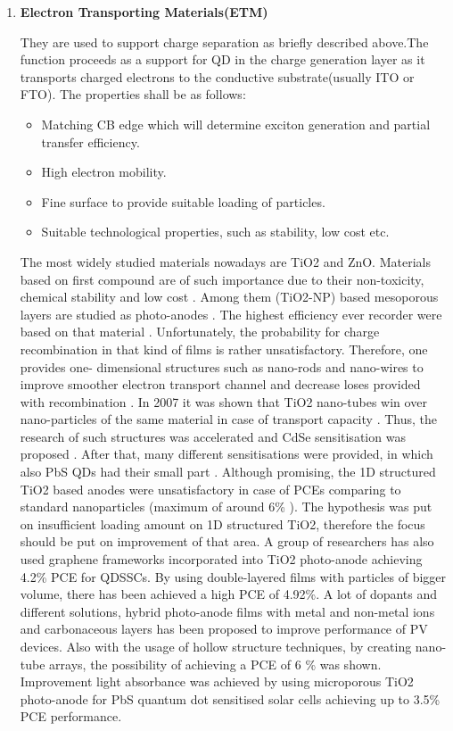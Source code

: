 \begin{enumerate}

\item \textbf{Electron Transporting Materials(ETM)}

They are used to support charge separation as briefly described above.The function proceeds as a support for QD in the charge generation layer as it transports charged electrons to the conductive substrate(usually ITO or FTO). \cite{X.Gao2017} \cite{Tian2015} The properties shall be as follows:
\begin{itemize}
\item
  Matching CB edge which will determine exciton generation and
  partial transfer efficiency.
\item
  High electron mobility.
\item
  Fine surface to provide suitable loading of particles.
\item
  Suitable technological properties, such as stability, low cost etc.
\end{itemize}

The most widely studied materials nowadays are TiO2 and ZnO. Materials based on first compound are of such importance due to their non-toxicity, chemical stability and low cost \cite{I.Mora-Sero2014a} \cite{Tian2015} . Among them (TiO2-NP) based mesoporous layers are studied as photo-anodes \cite{I.Mora-Sero2014a} . The highest efficiency ever recorder were based on that material \cite{Du2016} \cite{J.Du2017} . Unfortunately, the probability for charge recombination in that kind of films is rather unsatisfactory.  Therefore, one provides one- dimensional structures such as nano-rods and nano-wires to improve smoother electron transport channel and decrease loses provided with recombination \cite{Y.Liu2014} \cite{M.A.Manthrammel2015} . In 2007 it was shown that TiO2 nano-tubes win over nano-particles of the same material in case of transport capacity \cite{Kamat2009} \cite{Tvrdy2008} .  Thus, the research of such structures was accelerated and CdSe sensitisation was proposed \cite{A.Yamada2010} . After that, many different sensitisations were provided, in which also PbS QDs had their small part \cite{C.Shi2017} . Although promising, the 1D structured TiO2 based anodes were unsatisfactory in case of PCEs comparing to standard nanoparticles (maximum of around 6\%  ). The hypothesis was put on insufficient loading amount on 1D structured TiO2, therefore the focus should be put on improvement of that area. A group of researchers has also used graphene frameworks incorporated into TiO2 photo-anode achieving 4.2\% PCE for QDSSCs. \cite{XinMeng2014} By using double-layered films with particles of bigger volume, there has been achieved a high PCE of 4.92\%. A lot of dopants and different solutions, hybrid photo-anode films with metal and non-metal ions and carbonaceous layers has been proposed to improve performance of PV devices. Also with the usage of hollow structure techniques, by creating nano-tube arrays, the possibility of achieving a PCE of 6 \% was shown. \cite{MikhailArtemyev2019} Improvement light absorbance was achieved by using microporous TiO2 photo-anode for PbS quantum dot sensitised solar cells achieving up to 3.5\% PCE performance.


\end{enumerate}
